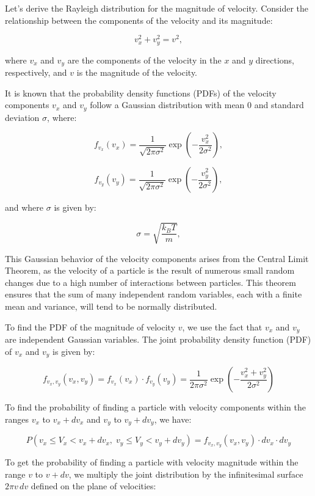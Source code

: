 \documentclass{article}
\begin{document}
Let’s derive the Rayleigh distribution for the magnitude of velocity. Consider the relationship between the components of the velocity and its magnitude:

\[
v_x^2 + v_y^2 = v^2,
\]

where \( v_x \) and \( v_y \) are the components of the velocity in the \( x \) and \( y \) directions, respectively, and \( v \) is the magnitude of the velocity.

It is known that the probability density functions (PDFs) of the velocity components \( v_x \) and \( v_y \) follow a Gaussian distribution with mean 0 and standard deviation \( \sigma \), where:

\[
f_{v_x}(v_x) = \frac{1}{\sqrt{2 \pi \sigma^2}} \exp \left( -\frac{v_x^2}{2 \sigma^2} \right),
\]

\[
f_{v_y}(v_y) = \frac{1}{\sqrt{2 \pi \sigma^2}} \exp \left( -\frac{v_y^2}{2 \sigma^2} \right),
\]

and where \( \sigma \) is given by:

\[
\sigma = \sqrt{\frac{k_B T}{m}},
\]

This Gaussian behavior of the velocity components arises from the Central Limit Theorem, as the velocity of a particle is the result of numerous small random changes due to a high number of interactions between particles. This theorem ensures that the sum of many independent random variables, each with a finite mean and variance, will tend to be normally distributed.

To find the PDF of the magnitude of velocity \( v \), we use the fact that \( v_x \) and \( v_y \) are independent Gaussian variables. The joint probability density function (PDF) of \( v_x \) and \( v_y \) is given by:

\[
f_{v_x, v_y}(v_x, v_y) = f_{v_x}(v_x) \cdot f_{v_y}(v_y) = \frac{1}{2 \pi \sigma^2} \exp \left( -\frac{v_x^2 + v_y^2}{2 \sigma^2} \right)
\]

To find the probability of finding a particle with velocity components within the ranges \( v_x \) to \( v_x + dv_x \) and \( v_y \) to \( v_y + dv_y \), we have:

\[
P(v_x \leq V_x < v_x + dv_x, \; v_y \leq V_y < v_y + dv_y) = f_{v_x, v_y}(v_x, v_y) \cdot dv_x \cdot dv_y
\]

To get the probability of finding a particle with velocity magnitude within the range \( v \) to \( v + dv \), we multiply the joint distribution by the infinitesimal surface \( 2 \pi v \, dv \) defined on the plane of velocities:
\end{document}
